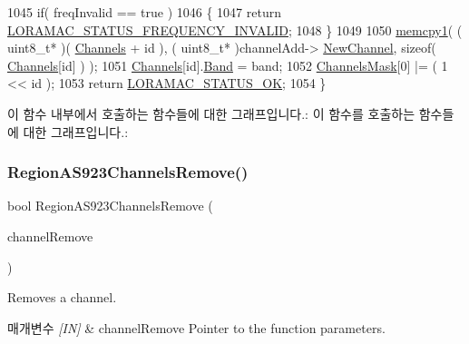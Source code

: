 \begin{DoxyCode}
1045     \textcolor{keywordflow}{if}( freqInvalid == \textcolor{keyword}{true} )
1046     \{
1047         \textcolor{keywordflow}{return} \mbox{\hyperlink{group___l_o_r_a_m_a_c_gga1d18f26b344040b3ec5c3db662919661ae3ea7b89796aed5a320013d9743b2955}{LORAMAC\_STATUS\_FREQUENCY\_INVALID}};
1048     \}
1049 
1050     \mbox{\hyperlink{utilities_8c_abfbe672c7136122f16c9214bc4ba8d21}{memcpy1}}( ( uint8\_t* )( \mbox{\hyperlink{_region_a_s923_8c_a02bae2504563543865d6b0e81c48ab61}{Channels}} + \textcolor{keywordtype}{id} ), ( uint8\_t* )channelAdd->
      \mbox{\hyperlink{structs_channel_add_params_afc31493a105479490228fd896b20b45c}{NewChannel}}, \textcolor{keyword}{sizeof}( \mbox{\hyperlink{_region_a_s923_8c_a02bae2504563543865d6b0e81c48ab61}{Channels}}[\textcolor{keywordtype}{id}] ) );
1051     \mbox{\hyperlink{_region_a_s923_8c_a02bae2504563543865d6b0e81c48ab61}{Channels}}[id].\mbox{\hyperlink{structs_channel_params_a724c03aa06953111c3291243831f251b}{Band}} = band;
1052     \mbox{\hyperlink{_region_a_s923_8c_a2188957b5ca6af8092154d7ccbfa5757}{ChannelsMask}}[0] |= ( 1 << id );
1053     \textcolor{keywordflow}{return} \mbox{\hyperlink{group___l_o_r_a_m_a_c_gga1d18f26b344040b3ec5c3db662919661a03db5fca052313edb3823c014b653a74}{LORAMAC\_STATUS\_OK}};
1054 \}
\end{DoxyCode}
이 함수 내부에서 호출하는 함수들에 대한 그래프입니다.\+:
이 함수를 호출하는 함수들에 대한 그래프입니다.\+:
\mbox{\label{group___r_e_g_i_o_n_a_s923_ga288bc8bbec286314166d13033979678f}} 
\subsubsection{\texorpdfstring{Region\+A\+S923\+Channels\+Remove()}{RegionAS923ChannelsRemove()}}
{\footnotesize\ttfamily bool Region\+A\+S923\+Channels\+Remove (\begin{DoxyParamCaption}\item[{\mbox{\hyperlink{group___r_e_g_i_o_n_gaa37468560d2fc81a977b57a48e5d72c0}{Channel\+Remove\+Params\+\_\+t}} $\ast$}]{channel\+Remove }\end{DoxyParamCaption})}



Removes a channel. 


\begin{DoxyParams}{매개변수}
{\em \mbox{[}\+I\+N\mbox{]}} & channel\+Remove Pointer to the function parameters.\\
\hline
\end{DoxyParams}

